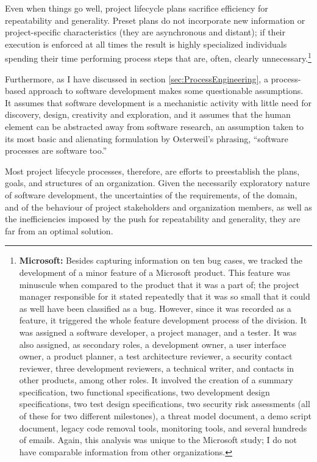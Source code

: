 Even when things go well, project lifecycle plans sacrifice efficiency for repeatability and generality. Preset plans do not incorporate new information or project-specific characteristics (they are asynchronous and distant); if their execution is enforced at all times the result is highly specialized individuals spending their time performing process steps that are, often, clearly unnecessary.\footnote{\textbf{Microsoft:} Besides capturing information on ten bug cases, we tracked the development of a minor feature of a Microsoft product. This feature was minuscule when compared to the product that it was a part of; the project manager responsible for it stated repeatedly that it was so small that it could as well have been classified as a bug. However, since it was recorded as a feature, it triggered the whole feature development process of the division. It was assigned a software developer, a project manager, and a tester. It was also assigned, as secondary roles, a development owner, a user interface owner, a product planner, a test architecture reviewer, a security contact reviewer, three development reviewers, a technical writer, and contacts in other products, among other roles. It involved the creation of a summary specification, two functional specifications, two development design specifications, two test design specifications, two security risk assessments (all of these for two different milestones), a threat model document, a demo script document, legacy code removal tools, monitoring tools, and several hundreds of emails. Again, this analysis was unique to the Microsoft study; I do not have comparable information from other organizations.}

Furthermore, as I have discussed in section \ref{sec:ProcessEngineering}, a process-based approach to software development makes some questionable assumptions. It assumes that software development is a mechanistic activity with little need for discovery, design, creativity and exploration, and it assumes that the human element can be abstracted away from software research, an assumption taken to its most basic and alienating formulation by Osterweil's  phrasing, ``software processes are software too.''

Most project lifecycle processes, therefore, are efforts to preestablish the plans, goals, and structures of an organization. Given the necessarily exploratory nature of software development, the uncertainties of the requirements, of the domain, and of the behaviour of project stakeholders and organization members, as well as the inefficiencies imposed by the push for repeatability and generality, they are far from an optimal solution.

